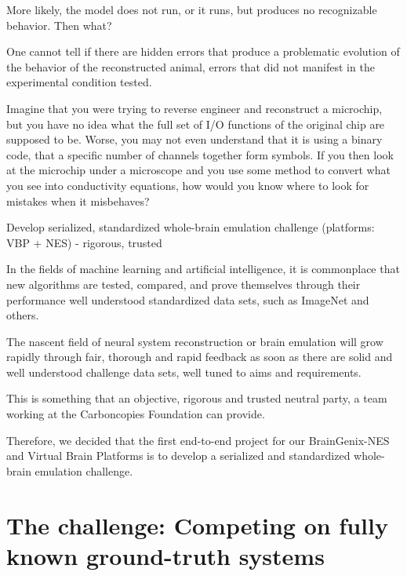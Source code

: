 \documentclass{ldr-article}
\begin{document}
More likely, the model does not run, or it runs, but produces no recognizable behavior. Then what?

One cannot tell if there are hidden errors that produce a problematic evolution of the behavior of the reconstructed animal, errors that did not manifest in the experimental condition tested.

Imagine that you were trying to reverse engineer and reconstruct a microchip, but you have no idea what the full set of I/O functions of the original chip are supposed to be. Worse, you may not even understand that it is using a binary code, that a specific number of channels together form symbols. If you then look at the microchip under a microscope and you use some method to convert what you see into conductivity equations, how would you know where to look for mistakes when it misbehaves?

Develop serialized, standardized whole-brain emulation challenge (platforms: VBP + NES) - rigorous, trusted

In the fields of machine learning and artificial intelligence, it is commonplace that new algorithms are tested, compared, and prove themselves through their performance well understood standardized data sets, such as ImageNet and others.

The nascent field of neural system reconstruction or brain emulation will grow rapidly through fair, thorough and rapid feedback as soon as there are solid and well understood challenge data sets, well tuned to aims and requirements.

This is something that an objective, rigorous and trusted neutral party, a team working at the Carboncopies Foundation can provide.

Therefore, we decided that the first end-to-end project for our BrainGenix-NES and Virtual Brain Platforms is to develop a serialized and standardized whole-brain emulation challenge.



\section{The challenge: Competing on fully known ground-truth systems}
\end{document}
